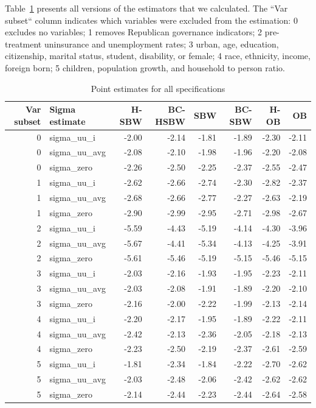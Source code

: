 \documentclass[12pt]{article}
\begin{document}
Table~\ref{tab:ptests} presents all versions of the estimators that we calculated. The ``Var subset`` column indicates which variables were excluded from the estimation: 0 excludes no variables; 1 removes Republican governance indicators; 2 pre-treatment uninsurance and unemployment rates; 3 urban, age, education, citizenship, marital status, student, disability, or female; 4 race, ethnicity, income, foreign born; 5 children, population growth, and household to person ratio.

\begin{table}[ht]
\centering
\begin{tabular}{rlrrrrrr}
  \toprule
Var subset & Sigma estimate & H-SBW & BC-HSBW & SBW & BC-SBW & H-OB & OB \\ 
  \midrule
0 & sigma\_uu\_i & -2.00 & -2.14 & -1.81 & -1.89 & -2.30 & -2.11 \\ 
  0 & sigma\_uu\_avg & -2.08 & -2.10 & -1.98 & -1.96 & -2.20 & -2.08 \\ 
  0 & sigma\_zero & -2.26 & -2.50 & -2.25 & -2.37 & -2.55 & -2.47 \\ 
  1 & sigma\_uu\_i & -2.62 & -2.66 & -2.74 & -2.30 & -2.82 & -2.37 \\ 
  1 & sigma\_uu\_avg & -2.68 & -2.66 & -2.77 & -2.27 & -2.63 & -2.19 \\ 
  1 & sigma\_zero & -2.90 & -2.99 & -2.95 & -2.71 & -2.98 & -2.67 \\ 
  2 & sigma\_uu\_i & -5.59 & -4.43 & -5.19 & -4.14 & -4.30 & -3.96 \\ 
  2 & sigma\_uu\_avg & -5.67 & -4.41 & -5.34 & -4.13 & -4.25 & -3.91 \\ 
  2 & sigma\_zero & -5.61 & -5.46 & -5.19 & -5.15 & -5.46 & -5.15 \\ 
  3 & sigma\_uu\_i & -2.03 & -2.16 & -1.93 & -1.95 & -2.23 & -2.11 \\ 
  3 & sigma\_uu\_avg & -2.03 & -2.08 & -1.91 & -1.89 & -2.20 & -2.10 \\ 
  3 & sigma\_zero & -2.16 & -2.00 & -2.22 & -1.99 & -2.13 & -2.14 \\ 
  4 & sigma\_uu\_i & -2.20 & -2.17 & -1.95 & -1.89 & -2.22 & -2.11 \\ 
  4 & sigma\_uu\_avg & -2.42 & -2.13 & -2.36 & -2.05 & -2.18 & -2.13 \\ 
  4 & sigma\_zero & -2.23 & -2.50 & -2.19 & -2.37 & -2.61 & -2.59 \\ 
  5 & sigma\_uu\_i & -1.81 & -2.34 & -1.84 & -2.22 & -2.70 & -2.62 \\ 
  5 & sigma\_uu\_avg & -2.03 & -2.48 & -2.06 & -2.42 & -2.62 & -2.62 \\ 
  5 & sigma\_zero & -2.14 & -2.44 & -2.23 & -2.44 & -2.64 & -2.58 \\ 
   \bottomrule
\end{tabular}
\caption{Point estimates for all specifications}
\label{tab:ptests}
\end{table}
\end{document}
